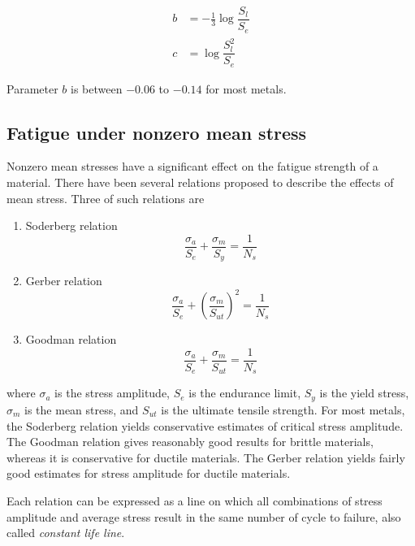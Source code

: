 \documentclass[
10pt,
a4paper,
openany,
svgnames,
]{kaobook} %
\begin{document}
\begin{align*}
  b &= - \frac{1}{3} \log \dfrac{S_l}{S_e} \\
  c &= \log \dfrac{S_l^2}{S_e}
\end{align*}

Parameter $b$ is between $-0.06$ to $-0.14$ for most metals.

\subsection{Fatigue under nonzero mean stress}

Nonzero mean stresses have a significant effect on the fatigue strength of a material. There have been several relations proposed to describe the effects of mean stress. Three of such relations are

\begin{enumerate}
\item Soderberg relation
  \begin{equation}
    \frac{\sigma_a}{S_e} + \frac{\sigma _m}{S_y} = \frac{1}{N_s}
  \end{equation}
\item Gerber relation
  \begin{equation}
    \frac{\sigma_a}{S_e} + \left( \frac{\sigma_m}{S_{ut}} \right)^2 = \frac{1}{N_s}
  \end{equation}
\item Goodman relation
  \begin{equation}
    \frac{\sigma_a}{S_e} + \frac{\sigma _m}{S_{ut}} = \frac{1}{N_s}
  \end{equation}
\end{enumerate}

where $\sigma_a$ is the stress amplitude, $S_e$ is the endurance limit, $S_y$ is the yield stress, $\sigma_m$ is the mean stress, and $S_{ut}$ is the ultimate tensile strength. For most metals, the Soderberg relation yields conservative estimates of critical stress amplitude. The Goodman relation gives reasonably good results for brittle materials, whereas it is conservative for ductile materials. The Gerber relation yields fairly good estimates for stress amplitude for ductile materials.

Each relation can be expressed as a line on which all combinations of stress amplitude and average stress result in the same number of cycle to failure, also called \emph{constant life line}.
\end{document}
